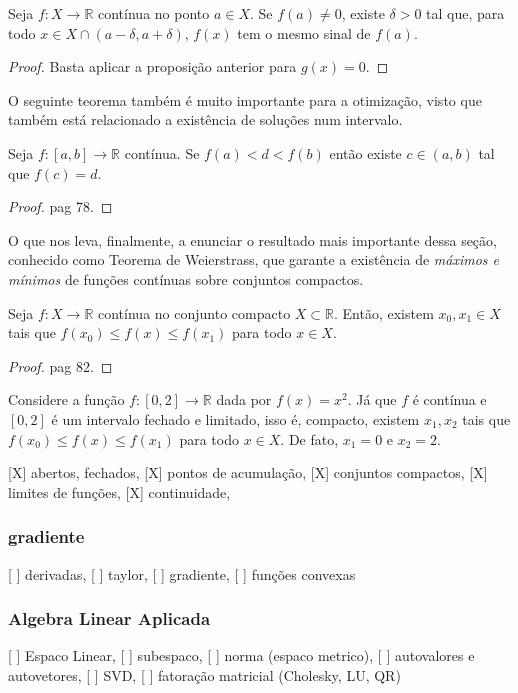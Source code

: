 \begin{corolario}
	Seja $f:X\to \mathbb{R}$ contínua no ponto $a\in X$. Se $f(a)\neq 0$, existe $\delta>0$ tal que, para todo $x\in X\cap (a-\delta,a+\delta)$, $f(x)$ tem o mesmo sinal de $f(a)$.
	\begin{proof}
		Basta aplicar a proposição anterior para $g(x) = 0$.
	\end{proof}
\end{corolario}

O seguinte teorema também é muito importante para a otimização, visto que também está relacionado a existência de soluções num intervalo. 

\begin{teorema}
	Seja $f:[a,b]\to \mathbb{R}$ contínua. Se $f(a)<d<f(b)$ então existe $c\in (a,b)$ tal que $f(c)=d$.
	\begin{proof}
		\cite{elonAnalise1} pag 78.
	\end{proof}
\end{teorema}

O que nos leva, finalmente, a enunciar o resultado mais importante dessa seção, conhecido como Teorema de Weierstrass, que garante a existência de \textit{máximos e mínimos} de funções contínuas sobre conjuntos compactos.

\begin{teorema}[Weierstrass]
	Seja $f: X \to \mathbb{R}$ contínua no conjunto compacto $X\subset \mathbb{R}$. Então, existem $x_0,x_1\in X$ tais que $f(x_0)\leq f(x)\leq f(x_1)$ para todo $x\in X$.
	\begin{proof}
		\cite{elonAnalise1} pag 82.
	\end{proof}
\end{teorema}

\begin{exemplo}
	Considere a função $f: [0, 2] \rightarrow \mathbb{R}$ dada por $ f(x) = x^2$. Já que $f$ é contínua e $[0,2]$ é um intervalo fechado e limitado, isso é, compacto, existem $x_1,x_2$ tais que $f(x_0)\leq f(x)\leq f(x_1)$ para todo $x\in X$. De fato, $x_1 = 0$ e $x_2 = 2$.
\end{exemplo}

{\color{red}
[X] abertos, fechados,
[X] pontos de acumulação,
[X] conjuntos compactos, 
[X] limites de funções,
[X] continuidade,}
\subsubsection{gradiente}
{\color{red}
[ ] derivadas,
[ ] taylor,
[ ] gradiente,
[ ] funções convexas
}
\subsubsection{Algebra Linear Aplicada}
{\color{red}
[ ] Espaco Linear,
[ ] subespaco,
[ ] norma (espaco metrico),
[ ] autovalores e autovetores,
[ ] SVD,
[ ] fatoração matricial (Cholesky, LU, QR)}

